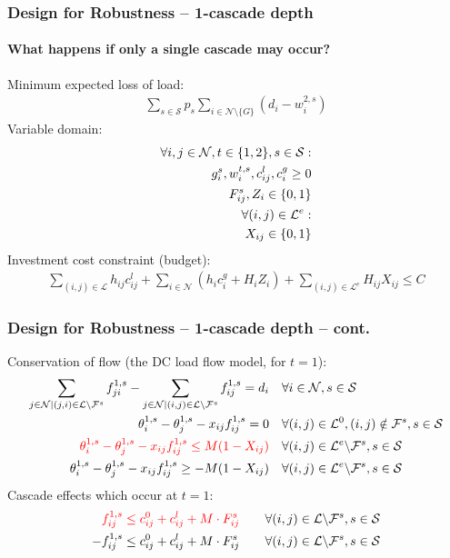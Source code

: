 \documentclass{beamer}
\begin{document}
\begin{frame}
\frametitle{Design for Robustness -- 1-cascade depth}
\framesubtitle{What happens if only a single cascade may occur?}
\vspace{0.1in}
Minimum expected loss of load:
\begin{align*}
\sum_{s\in\mathcal{S}}{p_s}\sum_{i\in\mathcal{N}\setminus\{G\}}{\left(d_i-w_i^{2,s}\right)}	
\end{align*}
\footnotesize
Variable domain:
\begin{align*}
	 \forall i,j\in\mathcal{N}, t\in\{1,2\}, s\in\mathcal{S}:\label{variable_domain}\\
	 g_i^s, w_i^{t,s}, c_{ij}^l, c_i^g\geq0\notag\\
	 F_{ij}^s, Z_i\in\{0,1\}\notag\\
	 \forall (i,j)\in\mathcal{L}^e:\\
	 X_{ij} \in\{0,1\}\notag
\end{align*}
Investment cost constraint (budget):
\begin{align*}
	 \sum_{(i,j)\in\mathcal{L}}{h_{ij}c_{ij}^l} + \sum_{i\in\mathcal{N}}\left(h_ic_i^g + H_iZ_i\right) + \sum_{(i,j)\in\mathcal{L}^e}{H_{ij}X_{ij}} \leq C
\end{align*}
\end{frame}
\begin{frame}
\frametitle{Design for Robustness -- 1-cascade depth -- cont.}\footnotesize
Conservation of flow (the DC load flow model, for $t=1$):
\begin{align*}
   \sum_{j\in\mathcal{N}|(j,i)\in\mathcal{L}\backslash\mathcal{F}^s}f_{ji}^{1,s}-\sum_{j\in\mathcal{N}|(i,j)\in\mathcal{L}\backslash\mathcal{F}^s}f_{ij}^{1,s} = d_i & \quad \forall i\in\mathcal{N}, s\in\mathcal{S}\\
	 \theta_i^{1,s}-\theta_j^{1,s}-x_{ij}f_{ij}^{1,s}=0 & \quad \forall (i,j)\in\mathcal{L}^0, (i,j)\notin\mathcal{F}^s, s\in\mathcal{S}\\
	 \color{red}{\theta_i^{1,s}-\theta_j^{1,s}-x_{ij}f_{ij}^{1,s}\leq M (1-X_{ij})} & \quad \forall (i,j)\in\mathcal{L}^e\backslash\mathcal{F}^s, s\in\mathcal{S}\\
	 \theta_i^{1,s}-\theta_j^{1,s}-x_{ij}f_{ij}^{1,s}\geq -M (1-X_{ij}) & \quad \forall (i,j)\in\mathcal{L}^e\backslash\mathcal{F}^s,  s\in\mathcal{S}
\end{align*}
Cascade effects which occur at $t=1$:
\begin{align*}
	\color{red}{f_{ij}^{1,s} \leq c_{ij}^0+c_{ij}^l + M\cdot F_{ij}^s} & \qquad \forall (i,j)\in\mathcal{L}\backslash\mathcal{F}^s, s\in\mathcal{S}\\
	 -f_{ij}^{1,s} \leq c_{ij}^0+c_{ij}^l + M\cdot F_{ij}^s & \qquad \forall (i,j)\in\mathcal{L}\backslash\mathcal{F}^s, s\in\mathcal{S}
\end{align*}
\end{frame}
\end{document}
